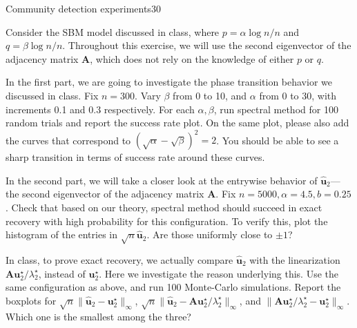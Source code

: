 \documentclass{article}
\begin{document}
\begin{problem}{Community detection experiments}{30}

Consider the SBM model discussed in class, where $p = \alpha \log n / n$ and $q = \beta \log n / n$. Throughout this exercise, we will use the second eigenvector of the adjacency matrix $\bm{A}$, which does not rely on the knowledge of either $p$ or $q$.

In the first part, we are going to investigate the phase transition behavior we discussed in class. Fix $n=300$. Vary $\beta$ from 0 to 10, and $\alpha$ from 0 to 30, with increments 0.1 and 0.3 respectively. For each $\alpha, \beta$, run spectral method for 100 random trials and report the success rate plot. On the same plot, please also add the curves that correspond to $(\sqrt{\alpha}- \sqrt{\beta})^2 = 2$. You should be able to see a sharp transition in terms of success rate around these curves. 


In the second part, we will take a closer look at the entrywise behavior of $\hat{\bm{u}}_{2}$---the second eigenvector of the adjacency matrix $\bm{A}$. Fix $n=5000, \alpha = 4.5, b = 0.25$. Check that based on our theory, spectral method should succeed in exact recovery with high probability for this configuration. To verify this, plot the histogram of the entries in $\sqrt{n} \hat{\bm{u}}_{2}$. Are those uniformly close to $\pm 1$? 


In class, to prove exact recovery, we actually compare $\hat{\bm{u}}_{2}$ with the linearization $\bm{A} \bm{u}^\star_{2} / \lambda^\star_{2}$, instead of $\bm{u}^\star_{2}$. Here we investigate the reason underlying this. Use the same configuration as above, and run 100 Monte-Carlo simulations. Report the boxplots for $\sqrt{n} \|\hat{\bm{u}}_{2} - \bm{u}^\star_{2}\|_{\infty}$, $\sqrt{n} \| \hat{\bm{u}}_{2} - \bm{A} \bm{u}^\star_{2} / \lambda^\star_{2}\|_{\infty}$, and $\|\bm{A} \bm{u}^\star_{2} / \lambda^\star_{2} - \bm{u}^\star_{2}\|_{\infty}$. Which one is the smallest among the three?
\end{problem}
\end{document}
